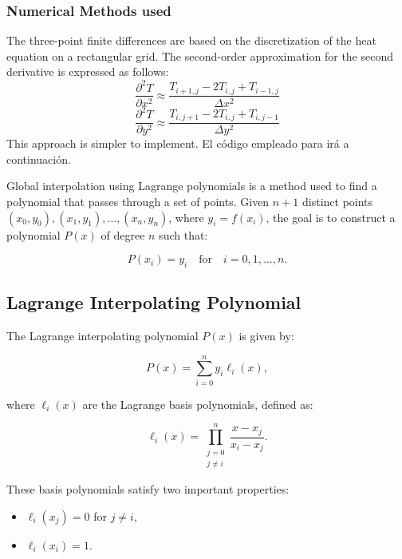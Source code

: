 \newpage



\subsubsection{Numerical Methods used}


The three-point finite differences are based on the discretization of the heat equation on a rectangular grid. The second-order approximation for the second derivative is expressed as follows:
\[
\frac{\partial^2 T}{\partial x^2} \approx \frac{T_{i+1,j} - 2T_{i,j} + T_{i-1,j}}{\Delta x^2}
\]
\[
\frac{\partial^2 T}{\partial y^2} \approx \frac{T_{i,j+1} - 2T_{i,j} + T_{i,j-1}}{\Delta y^2}
\]
This approach is simpler to implement. El código empleado para irá a continuación.








Global interpolation using Lagrange polynomials is a method used to find a polynomial that passes through a set of points. Given \( n+1 \) distinct points \( (x_0, y_0), (x_1, y_1), \dots, (x_n, y_n) \), where \( y_i = f(x_i) \), the goal is to construct a polynomial \( P(x) \) of degree \( n \) such that:

\[
P(x_i) = y_i \quad \text{for} \quad i = 0, 1, \dots, n.
\]

\subsection*{Lagrange Interpolating Polynomial}
The Lagrange interpolating polynomial \( P(x) \) is given by:

\[
P(x) = \sum_{i=0}^{n} y_i \ell_i(x),
\]

where \( \ell_i(x) \) are the Lagrange basis polynomials, defined as:

\[
\ell_i(x) = \prod_{\substack{j=0 \\ j \neq i}}^{n} \frac{x - x_j}{x_i - x_j}.
\]

These basis polynomials satisfy two important properties:
\begin{itemize}
    \item \( \ell_i(x_j) = 0 \) for \( j \neq i \),
    \item \( \ell_i(x_i) = 1 \).
\end{itemize}

